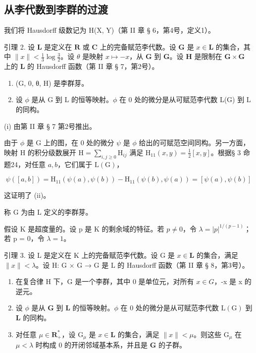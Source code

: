 \subsection{从李代数到李群的过渡}

我们将 Hausdorff 级数记为 H(X, Y)（第 II 章 § 6，第4号，定义1）。

引理 2. 设 \(\mathbf{L}\) 是定义在 \(\mathbf{R}\) 或 \(\mathbf{C}\) 上的完备赋范李代数。设 \(\mathbf{G}\) 是 \(x \in \mathbf{L}\) 的集合，其中 \(\| x \| < \frac{1}{3} \log \frac{3}{2}\)。设 \(\theta\) 是映射 \(x \mapsto -x\)，从 \(\mathbf{G}\) 到 \(\mathbf{G}\)。设 \(\mathbf{H}\) 是限制在 \(\mathbf{G} \times \mathbf{G}\) 上的 \(\mathbf{L}\) 的 Hausdorff 函数（第 II 章 § 7，第2号）。

\begin{enumerate}
\def\labelenumi{(\roman{enumi})}
\item
  (G, 0, θ, H) 是李群芽。
\item
  设 \(\phi\) 是从 G 到 L 的恒等映射。\(\phi\) 在 0 处的微分是从可赋范李代数 L(G) 到 L 的同构。
\end{enumerate}
(i) 由第 II 章 § 7 第2号推出。

由于 \(\phi\) 是 G 上的图，在 0 处的微分 \(\psi\) 是 \(\phi\) 给出的可赋范空间同构。另一方面，映射 H 的积分级数展开 \(\mathrm{H} = \sum_{i,j\geqslant 0}\mathrm{H}_{ij}\) 满足 \(\mathrm{H}_{11}(x,y) = \frac{1}{2} [x,y]\)。根据§ 3 命题24，对任意 \(a,b\)，它们属于 \(\mathrm{L}(\mathrm{G})\)，

\[
\psi ([ a, b ]) = \mathrm{H} _ {1 1} (\psi (a), \psi (b)) - \mathrm{H} _ {1 1} (\psi (b), \psi (a)) = [ \psi (a), \psi (b) ]
\]

这证明了 (ii)。

称 G 为由 L 定义的李群芽。

假设 K 是超度量的。设 p 是 K 的剩余域的特征。若 \(p \neq 0\)，令 \(\lambda = |p|^{1/(p-1)}\)；若 p = 0，令 \(\lambda = 1\)。

引理 3. 设 L 是定义在 K 上的完备赋范李代数。设 G 是 \(x \in \mathbf{L}\) 的集合，满足 \(\| x \| < \lambda\)。设 H: G × G → G 是 L 的 Hausdorff 函数（第 II 章 § 8，第3号）。

\begin{enumerate}
\def\labelenumi{(\roman{enumi})}
\item
  在复合律 H 下，G 是一个李群，其中 0 是单位元，对所有 \(x \in G\)，-x 是 x 的逆元。
\item
  设 \(\phi\) 是从 \(\mathbf{G}\) 到 \(\mathbf{L}\) 的恒等映射。\(\phi\) 在 0 处的微分是从可赋范李代数 \(\mathrm{L}(\mathrm{G})\) 到 \(\mathbf{L}\) 的同构。
\item
  对任意 \(\mu \in \mathbf{R}_+^*\)，设 \(\mathrm{G}_{\mu}\) 是 \(x \in \mathbf{L}\) 的集合，满足 \(\| x \| < \mu\)。则这些 \(\mathrm{G}_{\mu}\) 在 \(\mu < \lambda\) 时构成 0 的开闭邻域基本系，并且是 \(\mathbf{G}\) 的子群。
\end{enumerate}

